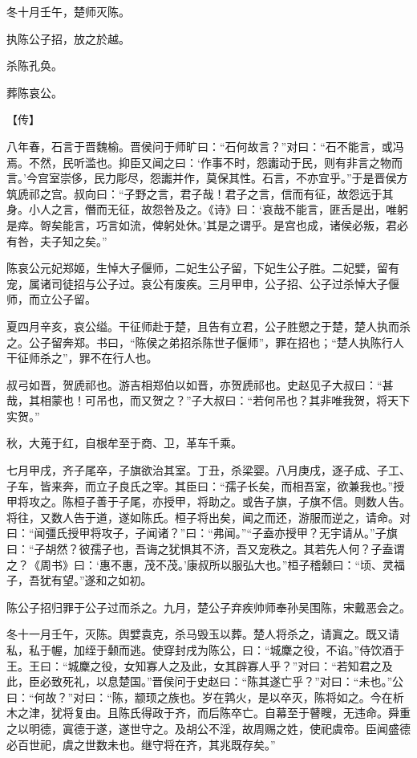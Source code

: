 \documentclass[a4paper,12pt,UTF8,twoside]{ctexbook}
\begin{document}
冬十月壬午，楚师灭陈。

执陈公子招，放之於越。

杀陈孔奂。

葬陈哀公。

【传】

八年春，石言于晋魏榆。晋侯问于师旷曰：“石何故言？”对曰：“石不能言，或冯焉。不然，民听滥也。抑臣又闻之曰：‘作事不时，怨讟动于民，则有非言之物而言。’今宫室崇侈，民力彫尽，怨讟并作，莫保其性。石言，不亦宜乎。”于是晋侯方筑虒祁之宫。叔向曰：“子野之言，君子哉！君子之言，信而有征，故怨远于其身。小人之言，僭而无征，故怨咎及之。《诗》曰：‘哀哉不能言，匪舌是出，唯躬是瘁。哿矣能言，巧言如流，俾躬处休。’其是之谓乎。是宫也成，诸侯必叛，君必有咎，夫子知之矣。”

陈哀公元妃郑姬，生悼大子偃师，二妃生公子留，下妃生公子胜。二妃嬖，留有宠，属诸司徒招与公子过。哀公有废疾。三月甲申，公子招、公子过杀悼大子偃师，而立公子留。

夏四月辛亥，哀公缢。干征师赴于楚，且告有立君，公子胜愬之于楚，楚人执而杀之。公子留奔郑。书曰，“陈侯之弟招杀陈世子偃师”，罪在招也；“楚人执陈行人干征师杀之”，罪不在行人也。

叔弓如晋，贺虒祁也。游吉相郑伯以如晋，亦贺虒祁也。史赵见子大叔曰：“甚哉，其相蒙也！可吊也，而又贺之？”子大叔曰：“若何吊也？其非唯我贺，将天下实贺。”

秋，大蒐于红，自根牟至于商、卫，革车千乘。

七月甲戌，齐子尾卒，子旗欲治其室。丁丑，杀梁婴。八月庚戌，逐子成、子工、子车，皆来奔，而立子良氏之宰。其臣曰：“孺子长矣，而相吾室，欲兼我也。”授甲将攻之。陈桓子善于子尾，亦授甲，将助之。或告子旗，子旗不信。则数人告。将往，又数人告于道，遂如陈氏。桓子将出矣，闻之而还，游服而逆之，请命。对曰：“闻彊氏授甲将攻子，子闻诸？”曰：“弗闻。”“子盍亦授甲？无宇请从。”子旗曰：“子胡然？彼孺子也，吾诲之犹惧其不济，吾又宠秩之。其若先人何？子盍谓之？《周书》曰：‘惠不惠，茂不茂。’康叔所以服弘大也。”桓子稽颡曰：“顷、灵福子，吾犹有望。”遂和之如初。

陈公子招归罪于公子过而杀之。九月，楚公子弃疾帅师奉孙吴围陈，宋戴恶会之。

冬十一月壬午，灭陈。舆嬖袁克，杀马毁玉以葬。楚人将杀之，请寘之。既又请私，私于幄，加绖于颡而逃。使穿封戌为陈公，曰：“城麇之役，不谄。”侍饮酒于王。王曰：“城麇之役，女知寡人之及此，女其辟寡人乎？”对曰：“若知君之及此，臣必致死礼，以息楚国。”晋侯问于史赵曰：“陈其遂亡乎？”对曰：“未也。”公曰：“何故？”对曰：“陈，颛顼之族也。岁在鹑火，是以卒灭，陈将如之。今在析木之津，犹将复由。且陈氏得政于齐，而后陈卒亡。自幕至于瞽瞍，无违命。舜重之以明德，寘德于遂，遂世守之。及胡公不淫，故周赐之姓，使祀虞帝。臣闻盛德必百世祀，虞之世数未也。继守将在齐，其兆既存矣。”
\end{document}
